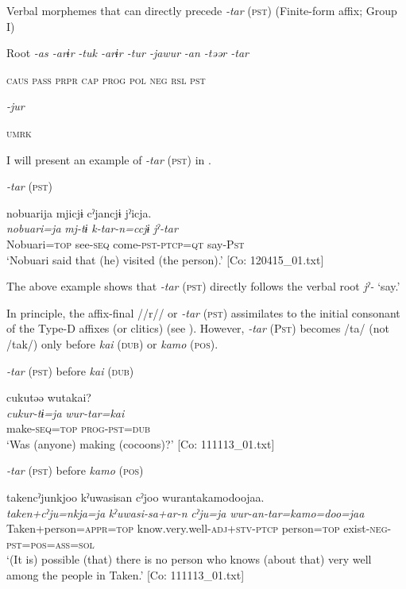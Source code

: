 \ea\label{ex:8-55}
  Verbal morphemes that can directly precede \textit{-tar} (\textsc{pst}) (Finite-form affix; Group I)

  Root  \textit{-as  -arɨr} %
\textit{-tuk  -arɨr  -tur  -jawur} %
\textit{-an  -təər  -tar}

    \textsc{caus}  \textsc{pass}  \textsc{prpr}  \textsc{cap}  \textsc{prog}  \textsc{pol}  \textsc{neg}  \textsc{rsl}  \textsc{pst}

          \textit{-jur}

          \textsc{umrk}
\z

I will present an example of \textit{-tar} (\textsc{pst}) in .

\ea\label{ex:8-56}
  \textit{-tar} (\textsc{pst})

  {\TM}
\glll  nobuarija  mjicjɨ  cˀjancjɨ  jˀicja.\\
\textit{nobuari=ja}  \textit{mj-tɨ}  \textit{k-tar-n=ccjɨ}  \textit{jˀ-tar}\\

    Nobuari=\textsc{top}  see-\textsc{seq}  come-\textsc{pst}-\textsc{ptcp}=\textsc{qt}  say-P\textsc{st}\\
\glt ‘Nobuari said that (he) visited (the person).’ [Co: 120415\_01.txt]
\z

The above example shows that \textit{-tar} (\textsc{pst}) directly follows the verbal root \textit{jˀ-} ‘say.’

In principle, the affix-final //r// or \textit{-tar} (\textsc{pst}) assimilates to the initial consonant of the Type-D affixes (or clitics) (see ). However, \textit{-tar} (P\textsc{st}) becomes /ta/ (not /tak/) only before \textit{kai} (\textsc{dub}) or \textit{kamo} (\textsc{pos}).

\ea\label{ex:8-57}
\ea \textit{-tar} (\textsc{pst}) before \textit{kai} (\textsc{dub})

  {\TM}
\glll  cukutəə  wutakai?\\
\textit{cukur-tɨ=ja}  \textit{wur-tar=kai}\\

    make-\textsc{seq}=\textsc{top}  \textsc{prog}-\textsc{pst}=\textsc{dub}\\
\glt ‘Was (anyone) making (cocoons)?’ [Co: 111113\_01.txt]


\ex \textit{-tar} (\textsc{pst}) before \textit{kamo} (\textsc{pos})

  {\TM}
\glll  takencˀjunkjoo  kˀuwasisan  cˀjoo    wurantakamodoojaa.\\
\textit{taken+cˀju=nkja=ja}  \textit{kˀuwasi-sa+ar-n}  \textit{cˀju=ja}    \textit{wur-an-tar=kamo=doo=jaa}\\
    Taken+person=\textsc{appr}=\textsc{top}  know.very.well-\textsc{adj}+\textsc{stv}-\textsc{ptcp}  person=\textsc{top}  exist-\textsc{neg}-\textsc{pst}=\textsc{pos}=\textsc{ass}=\textsc{sol}\\
\glt ‘(It is) possible (that) there is no person who knows (about that) very well among the people in Taken.’ [Co: 111113\_01.txt]
\z

